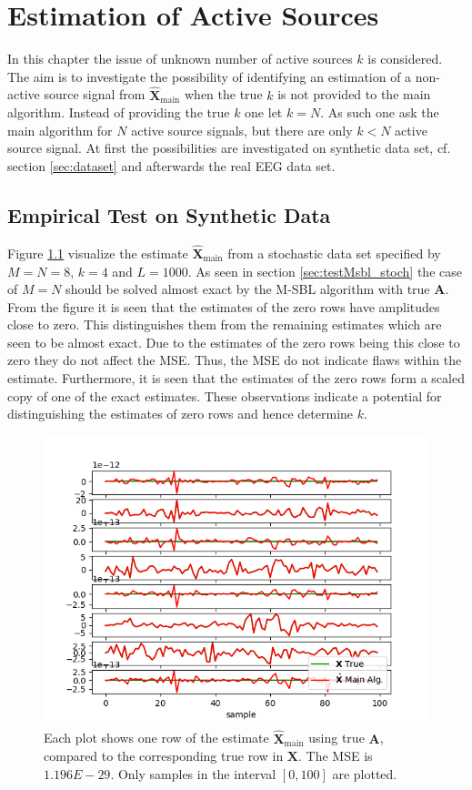 \chapter{Estimation of Active Sources}\label{ch:estimation_k}
In this chapter the issue of unknown number of active sources $k$ is considered. 
The aim is to investigate the possibility of identifying an estimation of a non-active source signal from $\hat{\textbf{X}}_{\text{main}}$ when the true $k$ is not provided to the main algorithm. 
Instead of providing the true $k$ one let $k = N$.
As such one ask the main algorithm for $N$ active source signals, but there are only $k < N$ active source signal. 
At first the possibilities are investigated on synthetic data set, cf. section \ref{sec:dataset} and afterwards the real EEG data set.   

\section{Empirical Test on Synthetic Data}
Figure \ref{fig:ktest1} visualize the estimate $\hat{\mathbf{X}}_{\text{main}}$ from a stochastic data set specified by $M = N = 8$, $k = 4$ and $L = 1000$. 
As seen in section \ref{sec:testMsbl_stoch} the case of $M = N$ should be solved almost exact by the M-SBL algorithm with true $\mathbf{A}$. 
From the figure it is seen that the estimates of the zero rows have amplitudes close to zero.
This distinguishes them from the remaining estimates which are seen to be almost exact. 
Due to the estimates of the zero rows being this close to zero they do not affect the MSE. 
Thus, the MSE do not indicate flaws within the estimate. 
Furthermore, it is seen that the estimates of the zero rows form a scaled copy of one of the exact estimates. 
These observations indicate a potential for distinguishing the estimates of zero rows and hence determine $k$.     
\begin{figure}[H]
    \centering
	\includegraphics[scale=0.5]{figures/ch_estimate/k_test1.png}
	\caption{Each plot shows one row of the estimate $\hat{\mathbf{X}}_{\text{main}}$ using true $\mathbf{A}$, compared to the corresponding true row in $\mathbf{X}$. The MSE is $1.196E-29$. Only samples in the interval $[0,100]$ are plotted.}
	\label{fig:ktest1}
\end{figure}
